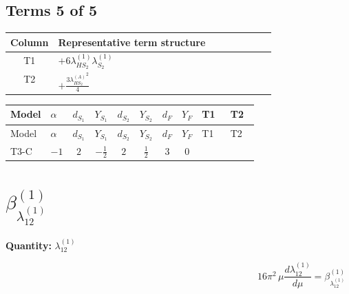 \documentclass[8pt]{article}
\begin{document}
\begin{landscape}
\subsection*{Terms 5 of 5}
\begin{center}
\begin{tabular}{@{}c >{\raggedright\arraybackslash}p{0.82\linewidth}@{}}
\toprule
Column & Representative term structure \\
\midrule
T1 & \(\displaystyle +6 {\lambda_{HS_2}^{(1)}} {\lambda_{S_2}^{(1)}}\) \\
\midrule
T2 & \(\displaystyle +\frac{3 {\lambda_{HS_2}^{(A)}}^2}{4}\) \\
\midrule
\bottomrule
\end{tabular}
\end{center}
\smallskip
\tiny
\begin{longtable}{@{}llcccccc >{\raggedright\arraybackslash}p{0.21\linewidth} >{\raggedright\arraybackslash}p{0.21\linewidth}@{}}
\toprule
Model & $\alpha$ & $d_{S_1}$ & $Y_{S_1}$ & $d_{S_2}$ & $Y_{S_2}$ & $d_F$ & $Y_F$ & T1 & T2 \\
\midrule
\endfirsthead
\toprule
Model & $\alpha$ & $d_{S_1}$ & $Y_{S_1}$ & $d_{S_2}$ & $Y_{S_2}$ & $d_F$ & $Y_F$ & T1 & T2 \\
\midrule
\endhead
T3-C & $-1$ & $2$ & $-\frac{1}{2}$ & $2$ & $\frac{1}{2}$ & $3$ & $0$ & \scriptsize\adjustbox{max width=\linewidth}{$\begin{gathered} +6 {\lambda_{HS_2}^{(1)}} {\lambda_{S_2}^{(1)}}\end{gathered}$} & \scriptsize\adjustbox{max width=\linewidth}{$\begin{gathered} +\frac{3 {\lambda_{HS_2}^{(A)}}^2}{4}\end{gathered}$} \\
\midrule
\bottomrule
\end{longtable}
\clearpage
\section*{$\beta_{\lambda_{12}^{(1)}}^{(1)}$}
\noindent\textbf{Quantity: }$\lambda_{12}^{(1)}$\par\smallskip
\[16\pi^2\,\mu\frac{d \lambda_{12}^{(1)}}{d\mu}=\beta_{\lambda_{12}^{(1)}}^{(1)}\]

\end{landscape}
\end{document}
